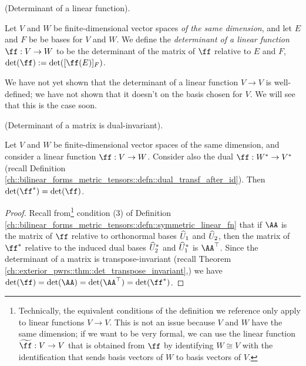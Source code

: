 

\begin{defn}
    (Determinant of a linear function).
    
    Let $V$ and $W$ be finite-dimensional vector spaces \textit{of the same dimension}, and let $E$ and $F$ be be bases for $V$ and $W$. We define the \textit{determinant of a linear function $\ff:V \rightarrow W$} to be the determinant of the matrix of $\ff$ relative to $E$ and $F$, $\det(\ff) := \det([\ff(E)]_F)$.
\end{defn}

\begin{remark}
    We have not yet shown that the determinant of a linear function $V \rightarrow V$ is well-defined; we have not shown that it doesn't on the basis chosen for $V$. We will see that this is the case soon.
\end{remark}

\begin{theorem}
\label{ch::exterior_pwrs::rmk::det_dual_invariant}

    (Determinant of a matrix is dual-invariant).
    
    Let $V$ and $W$ be finite-dimensional vector spaces of the same dimension, and consider a linear function $\ff:V \rightarrow W$. Consider also the dual $\ff:W^* \rightarrow V^*$ (recall Definition \ref{ch::bilinear_forms_metric_tensors::defn::dual_transf_after_id}). Then $\det(\ff^*) = \det(\ff)$.
\end{theorem}

\begin{proof}
    Recall from\footnote{Technically, the equivalent conditions of the definition we reference only apply to linear functions $V \rightarrow V$. This is not an issue because $V$ and $W$ have the same dimension; if we want to be very formal, we can use the linear function $\widetilde{\ff}:V \rightarrow V$ that is obtained from $\ff$ by identifying $W \cong V$ with the identification that sends basis vectors of $W$ to basis vectors of $V$.} condition (3) of Definition \ref{ch::bilinear_forms_metric_tensors::defn::symmetric_linear_fn} that if $\AA$ is the matrix of $\ff$ relative to orthonormal bases $\widehat{U}_1$ and $\widehat{U}_2$, then the matrix of $\ff^*$ relative to the induced dual bases $\widehat{U}_2^*$ and $\widehat{U}_1^*$ is $\AA^\top$. Since the determinant of a matrix is transpose-invariant (recall Theorem \ref{ch::exterior_pwrs::thm::det_transpose_invariant},) we have $\det(\ff) = \det(\AA) = \det(\AA^\top) = \det(\ff^*)$.
\end{proof}

